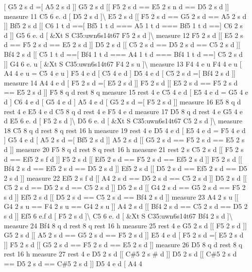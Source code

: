 \mbox{[} G5 2 s d =\mbox{[} A5 2 s d \mbox{]}\mbox{]} G5 2 s d \mbox{[}\mbox{[} F5 2 s d == E5 2 s n d == D5 2 s d \mbox{]}\mbox{]} measure 11 C5 6 e. d \mbox{[} D5 2 s d \mbox{]}\textbackslash{} E5 2 s d \mbox{[}\mbox{[} F5 2 s d == G5 2 s d == A5 2 s d \mbox{]}\mbox{]} Bf5 2 s d \mbox{[}\mbox{[} C6 1 t d ==\mbox{[} Bf5 1 t d === A5 1 t d === Bf5 1 t d ==\mbox{]} C6 2 s d \mbox{]}\mbox{]} G5 6 e. d \mbox{[} \&Xt S C35\+:uwn6s14t67 F5 2 s d \mbox{]}\textbackslash{} measure 12 F5 2 s d \mbox{[}\mbox{[} E5 2 s d == F5 2 s d == E5 2 s d \mbox{]}\mbox{]} D5 2 s d \mbox{[}\mbox{[} C5 2 s d == D5 2 s d == C5 2 s d \mbox{]}\mbox{]} Bf4 2 s d \mbox{[}\mbox{[} C5 1 t d ==\mbox{[} Bf4 1 t d === A4 1 t d === Bf4 1 t d ==\mbox{]} C5 2 s d \mbox{]}\mbox{]} G4 6 e. u \mbox{[} \&Xt S C35\+:uwn6s14t67 F4 2 s u \mbox{]}\textbackslash{} measure 13 F4 4 e u F4 4 e u \mbox{[} A4 4 e u = C5 4 e u \mbox{]} F5 4 e d \mbox{[} C5 4 e d \mbox{]} D5 4 e d \mbox{[} C5 2 s d =\mbox{[} Bf4 2 s d \mbox{]}\mbox{]} measure 14 A4 4 e d \mbox{[} F5 2 s d =\mbox{[} E5 2 s d \mbox{]}\mbox{]} F5 2 s d \mbox{[}\mbox{[} E5 2 s d == F5 2 s d == E5 2 s d \mbox{]}\mbox{]} F5 8 q d rest 8 q measure 15 rest 4 e C5 4 e d \mbox{[} E5 4 e d = G5 4 e d \mbox{]} C6 4 e d \mbox{[} G5 4 e d \mbox{]} A5 4 e d \mbox{[} G5 2 s d =\mbox{[} F5 2 s d \mbox{]}\mbox{]} measure 16 E5 8 q d rest 4 e E5 4 e d C5 8 q d rest 4 e F5 4 e d measure 17 D5 8 q d rest 4 e G5 4 e d E5 6 e. d \mbox{[} F5 2 s d \mbox{]}\textbackslash{} D5 6 e. d \mbox{[} \&Xt S C35\+:uwn6s14t67 C5 2 s d \mbox{]}\textbackslash{} measure 18 C5 8 q d rest 8 q rest 16 h measure 19 rest 4 e D5 4 e d \mbox{[} E5 4 e d = F5 4 e d \mbox{]} G5 4 e d \mbox{[} A5 2 s d =\mbox{[} Bf5 2 s d \mbox{]}\mbox{]} A5 2 s d \mbox{[}\mbox{[} G5 2 s d == F5 2 s d == E5 2 s d \mbox{]}\mbox{]} measure 20 F5 8 q d rest 8 q rest 16 h measure 21 rest 2 s C5 2 s d \mbox{[}\mbox{[} F5 2 s d == Ef5 2 s f d \mbox{]}\mbox{]} F5 2 s d \mbox{[}\mbox{[} Ef5 2 s d == F5 2 s d == Ef5 2 s d \mbox{]}\mbox{]} F5 2 s d \mbox{[}\mbox{[} Bf4 2 s d == Ef5 2 s d == D5 2 s d \mbox{]}\mbox{]} Ef5 2 s d \mbox{[}\mbox{[} D5 2 s d == Ef5 2 s d == D5 2 s d \mbox{]}\mbox{]} measure 22 Ef5 2 s f d \mbox{[}\mbox{[} A4 2 s d == D5 2 s d == C5 2 s d \mbox{]}\mbox{]} D5 2 s d \mbox{[}\mbox{[} C5 2 s d == D5 2 s d == C5 2 s d \mbox{]}\mbox{]} D5 2 s d \mbox{[}\mbox{[} G4 2 s d == G5 2 s d == F5 2 s d \mbox{]}\mbox{]} Ef5 2 s d \mbox{[}\mbox{[} D5 2 s d == C5 2 s d == Bf4 2 s d \mbox{]}\mbox{]} measure 23 A4 2 s u \mbox{[}\mbox{[} G4 2 s u == F4 2 s u == G4 2 s u \mbox{]}\mbox{]} A4 2 s d \mbox{[}\mbox{[} Bf4 2 s d == C5 2 s d == D5 2 s d \mbox{]}\mbox{]} Ef5 6 e.\+f d \mbox{[} F5 2 s d \mbox{]}\textbackslash{} C5 6 e. d \mbox{[} \&Xt S C35\+:uwn6s14t67 Bf4 2 s d \mbox{]}\textbackslash{} measure 24 Bf4 8 q d rest 8 q rest 16 h measure 25 rest 4 e G5 2 s d \mbox{[}\mbox{[} F5 2 s d \mbox{]}\mbox{]} G5 2 s d \mbox{[}\mbox{[} A5 2 s d == G5 2 s d == F5 2 s d \mbox{]}\mbox{]} E5 4 e d \mbox{[} F5 2 s d =\mbox{[} E5 2 s d \mbox{]}\mbox{]} F5 2 s d \mbox{[}\mbox{[} G5 2 s d == F5 2 s d == E5 2 s d \mbox{]}\mbox{]} measure 26 D5 8 q d rest 8 q rest 16 h measure 27 rest 4 e D5 2 s d \mbox{[}\mbox{[} C\#5 2 s \# d \mbox{]}\mbox{]} D5 2 s d \mbox{[}\mbox{[} C\#5 2 s d == D5 2 s d == C\#5 2 s d \mbox{]}\mbox{]} D5 4 e d \mbox{[} A4 4 